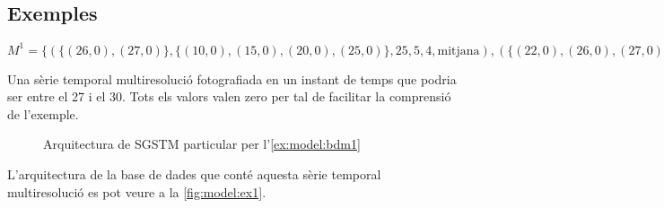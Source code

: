 \subsection{Exemples}

\begin{example} 
\label{ex:model:bdm1}%



$M^1 = \{ ( \{(26,0),(27,0)\}  , \{(10,0),(15,0),(20,0),(25,0)\} , 25 , 5 ,4 , \text{mitjana} ) , ( \{(22,0),(26,0),(27,0)\} , \{(0,0),(10,0),(20,0)\} , 20 , 10 ,3 , \text{mitjana} ) \}$


Una sèrie temporal multiresolució fotografiada en un instant de temps que podria
ser entre el 27 i el 30. Tots els valors valen zero per tal de facilitar la comprensió de l'exemple.


\begin{figure}[tp]
\centering

\caption{Arquitectura de SGSTM particular per l'\autoref{ex:model:bdm1}}
\label{fig:model:ex1}
\end{figure}

L'arquitectura de la base de dades que conté aquesta sèrie temporal multiresolució es pot veure a la \autoref{fig:model:ex1}.





\end{example}
